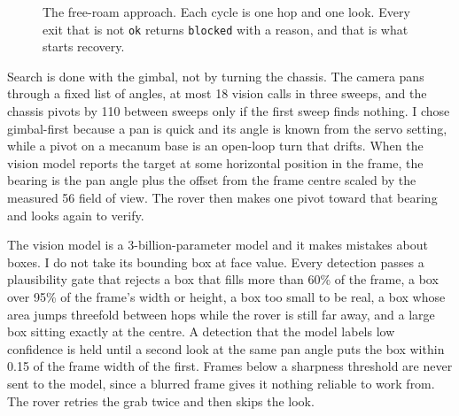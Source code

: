 \begin{figure}[htbp]
  \centering
  \caption{The free-roam approach. Each cycle is one hop and one look. Every exit that is not \texttt{ok} returns \texttt{blocked} with a reason, and that is what starts recovery.}
  \label{fig:approach}
\end{figure}

Search is done with the gimbal, not by turning the chassis. The camera pans
through a fixed list of angles, at most 18 vision calls in three sweeps, and the
chassis pivots by 110\textdegree{} between sweeps only if the first sweep finds
nothing. I chose gimbal-first because a pan is quick and its angle is known from
the servo setting, while a pivot on a mecanum base is an open-loop turn that
drifts. When the vision model reports the target at some horizontal position in
the frame, the bearing is the pan angle plus the offset from the frame centre
scaled by the measured 56\textdegree{} field of view. The rover then makes one
pivot toward that bearing and looks again to verify.

The vision model is a 3-billion-parameter model and it makes mistakes about
boxes. I do not take its bounding box at face value. Every detection passes a
plausibility gate that rejects a box that fills more than 60\% of the frame, a box
over 95\% of the frame's width or height, a box too small to be real, a box whose
area jumps threefold between hops while the rover is still far away, and a large
box sitting exactly at the centre. A detection that the model labels low
confidence is held until a second look at the same pan angle puts the box within
0.15 of the frame width of the first. Frames below a sharpness threshold are
never sent to the model, since a blurred frame gives it nothing reliable to
work from. The rover retries the grab twice and then skips the look.

